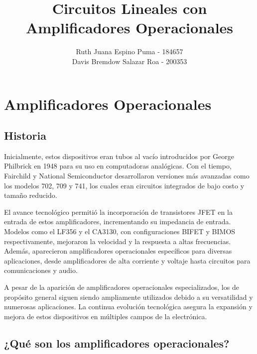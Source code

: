 \documentclass[stu, 12pt, letterpaper, donotrepeattitle, floatsintext, natbib, unicode]{apa7}
\title{Circuitos Lineales con Amplificadores Operacionales}
\author{Ruth Juana Espino Puma - 184657 \\Davis Bremdow Salazar Roa - 200353 }
\affiliation{Universidad Nacional de San Antonio Abad del Cusco}
\begin{document}
\begin{abstract}
	
\end{abstract}

\maketitle
\newpage

\renewcommand\contentsname{\large Indice}
\tableofcontents
\newpage

\section{Amplificadores Operacionales}
\subsection{Historia}
Inicialmente, estos dispositivos eran tubos al vacío introducidos por George Philbrick en 1948 para su uso en computadoras analógicas. Con el tiempo, Fairchild y National Semiconductor desarrollaron versiones más avanzadas como los modelos 702, 709 y 741, los cuales eran circuitos integrados de bajo costo y tamaño reducido.

El avance tecnológico permitió la incorporación de transistores JFET en la entrada de estos amplificadores, incrementando su impedancia de entrada. Modelos como el LF356 y el CA3130, con configuraciones BIFET y BIMOS respectivamente, mejoraron la velocidad y la respuesta a altas frecuencias. Además, aparecieron amplificadores operacionales específicos para diversas aplicaciones, desde amplificadores de alta corriente y voltaje hasta circuitos para comunicaciones y audio.

A pesar de la aparición de amplificadores operacionales especializados, los de propósito general siguen siendo ampliamente utilizados debido a su versatilidad y numerosas aplicaciones. La continua evolución tecnológica asegura la expansión y mejora de estos dispositivos en múltiples campos de la electrónica.

\subsection{¿Qué son los amplificadores operacionales?}



\renewcommand\refname{\large\textbf{Referencias}}



\end{document}
